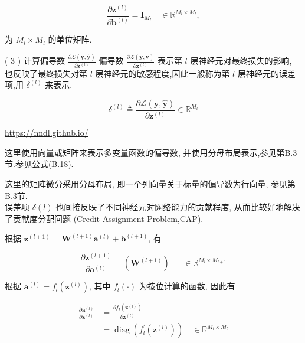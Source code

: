 \documentclass[10pt]{article}
\begin{document}
\begin{equation*}
\frac{\partial \boldsymbol{z}^{(l)}}{\partial \boldsymbol{b}^{(l)}}=\boldsymbol{I}_{M_{l}} \quad \in \mathbb{R}^{M_{l} \times M_{l}}, \tag{4.55}
\end{equation*}


为 $M_{l} \times M_{l}$ 的单位矩阵.

( 3 ) 计算偏导数 $\frac{\partial \mathcal{L}(\boldsymbol{y}, \hat{\boldsymbol{y}})}{\partial \boldsymbol{z}^{(l)}}$ 偏导数 $\frac{\partial \mathcal{L}(\boldsymbol{y}, \hat{\boldsymbol{y}})}{\partial \boldsymbol{z}^{(l)}}$ 表示第 $l$ 层神经元对最终损失的影响, 也反映了最终损失对第 $l$ 层神经元的敏感程度,因此一般称为第 $l$ 层神经元的误差项,用 $\delta^{(l)}$ 来表示.


\begin{equation*}
\delta^{(l)} \triangleq \frac{\partial \mathcal{L}(\boldsymbol{y}, \hat{\boldsymbol{y}})}{\partial \boldsymbol{z}^{(l)}} \in \mathbb{R}^{M_{l}} \tag{4.56}
\end{equation*}


\href{https://nndl.github.io/}{https://nndl.github.io/}

这里使用向量或矩阵来表示多变量函数的偏导数, 并使用分母布局表示,参见第B.3节.参见公式(B.18).

这里的矩阵微分采用分母布局, 即一个列向量关于标量的偏导数为行向量, 参见第B.3节.\\
误差项 $\delta(l)$ 也间接反映了不同神经元对网络能力的贡献程度, 从而比较好地解决了贡献度分配问题 (Credit Assignment Problem,CAP).

根据 $\boldsymbol{z}^{(l+1)}=\boldsymbol{W}^{(l+1)} \boldsymbol{a}^{(l)}+\boldsymbol{b}^{(l+1)}$, 有


\begin{equation*}
\frac{\partial \boldsymbol{z}^{(l+1)}}{\partial \boldsymbol{a}^{(l)}}=\left(\boldsymbol{W}^{(l+1)}\right)^{\top} \quad \in \mathbb{R}^{M_{l} \times M_{l+1}} \tag{4.57}
\end{equation*}


根据 $\boldsymbol{a}^{(l)}=f_{l}\left(\boldsymbol{z}^{(l)}\right)$, 其中 $f_{l}(\cdot)$ 为按位计算的函数, 因此有


\begin{align*}
\frac{\partial \boldsymbol{a}^{(l)}}{\partial \boldsymbol{z}^{(l)}} & =\frac{\partial f_{l}\left(\boldsymbol{z}^{(l)}\right)}{\partial \boldsymbol{z}^{(l)}}  \tag{4.58}\\
& =\operatorname{diag}\left(f_{l}^{\prime}\left(\boldsymbol{z}^{(l)}\right)\right) \quad \in \mathbb{R}^{M_{l} \times M_{l}} \tag{4.59}
\end{align*}
\end{document}
